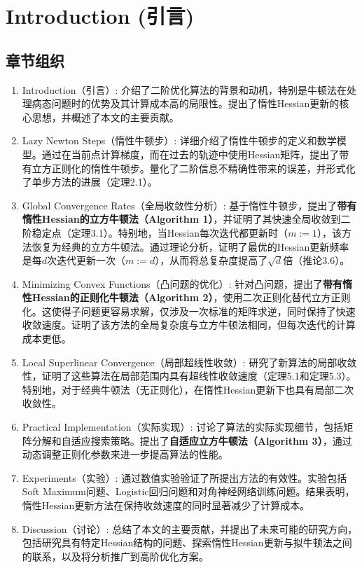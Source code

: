 \documentclass[a4paper,twoside,AutoFakeBold]{article}
\theoremstyle{definition}
\begin{document}
\songti\xiaosi
%
\section{Introduction (引言)}

\subsection{章节组织}
\begin{enumerate}
    \item Introduction（引言）: 介绍了二阶优化算法的背景和动机，特别是牛顿法在处理病态问题时的优势及其计算成本高的局限性。提出了惰性Hessian更新的核心思想，并概述了本文的主要贡献。
	\item Lazy Newton Steps（惰性牛顿步）: 详细介绍了惰性牛顿步的定义和数学模型。通过在当前点计算梯度，而在过去的轨迹中使用Hessian矩阵，提出了带有立方正则化的惰性牛顿步。量化了二阶信息不精确性带来的误差，并形式化了单步方法的进展（定理2.1）。
	\item Global Convergence Rates（全局收敛性分析）: 基于惰性牛顿步，提出了\textbf{带有惰性Hessian的立方牛顿法（Algorithm 1）}，并证明了其快速全局收敛到二阶稳定点（定理3.1）。特别地，当Hessian每次迭代都更新时（\(m := 1\)），该方法恢复为经典的立方牛顿法。通过理论分析，证明了最优的Hessian更新频率是每\(d\)次迭代更新一次（\(m := d\)），从而将总复杂度提高了\(\sqrt{d}\)倍（推论3.6）。
	\item Minimizing Convex Functions（凸问题的优化）: 针对凸问题，提出了\textbf{带有惰性Hessian的正则化牛顿法（Algorithm 2）}，使用二次正则化替代立方正则化。这使得子问题更容易求解，仅涉及一次标准的矩阵求逆，同时保持了快速收敛速度。证明了该方法的全局复杂度与立方牛顿法相同，但每次迭代的计算成本更低。
	\item Local Superlinear Convergence（局部超线性收敛）: 研究了新算法的局部收敛性，证明了这些算法在局部范围内具有超线性收敛速度（定理5.1和定理5.3）。特别地，对于经典牛顿法（无正则化），在惰性Hessian更新下也具有局部二次收敛性。
	\item Practical Implementation（实际实现）: 讨论了算法的实际实现细节，包括矩阵分解和自适应搜索策略。提出了\textbf{自适应立方牛顿法（Algorithm 3）}，通过动态调整正则化参数来进一步提高算法的性能。
	\item Experiments（实验）: 通过数值实验验证了所提出方法的有效性。实验包括Soft Maximum问题、Logistic回归问题和对角神经网络训练问题。结果表明，惰性Hessian更新方法在保持收敛速度的同时显著减少了计算成本。
	\item Discussion（讨论）: 总结了本文的主要贡献，并提出了未来可能的研究方向，包括研究具有特定Hessian结构的问题、探索惰性Hessian更新与拟牛顿法之间的联系，以及将分析推广到高阶优化方案。
\end{enumerate}
\end{document}

